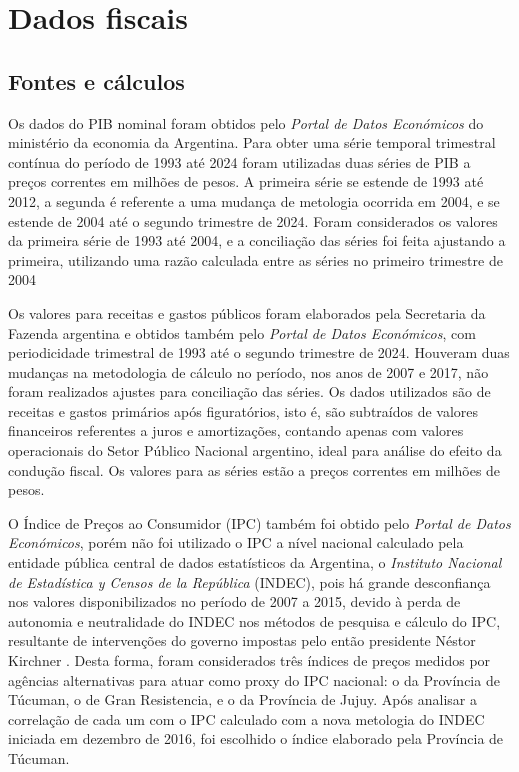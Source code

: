 \documentclass[a4paper, 12pt, openany, oneside, brazil]{abntex2}
\begin{document}
\chapter{Dados fiscais}

\section{Fontes e cálculos}

Os dados do PIB nominal foram obtidos pelo \textit{Portal de Datos Económicos} do ministério da economia da Argentina. Para obter uma série temporal trimestral contínua do período de 1993 até 2024 foram utilizadas duas séries de PIB a preços correntes em milhões de pesos. A primeira série se estende de 1993 até 2012, a segunda é referente a uma mudança de metologia ocorrida em 2004, e se estende de 2004 até o segundo trimestre de 2024. Foram considerados os valores da primeira série de 1993 até 2004, e a conciliação das séries foi feita ajustando a primeira, utilizando uma razão calculada entre as séries no primeiro trimestre de 2004

Os valores para receitas e gastos públicos foram elaborados pela Secretaria da Fazenda argentina e obtidos também pelo \textit{Portal de Datos Económicos}, com periodicidade trimestral de 1993 até o segundo trimestre de 2024. Houveram duas mudanças na metodologia de cálculo no período, nos anos de 2007 e 2017, não foram realizados ajustes para conciliação das séries. Os dados utilizados são de receitas e gastos primários após figuratórios, isto é, são subtraídos de valores financeiros referentes a juros e amortizações, contando apenas com valores operacionais do Setor Público Nacional argentino, ideal para análise do efeito da condução fiscal. Os valores para as séries estão a preços correntes em milhões de pesos.

O Índice de Preços ao Consumidor (IPC) também foi obtido pelo \textit{Portal de Datos Económicos}, porém não foi utilizado o IPC a nível nacional calculado pela entidade pública central de dados estatísticos da Argentina, o \textit{Instituto Nacional de Estadística y Censos de la República} (INDEC), pois há grande desconfiança nos valores disponibilizados no período de 2007 a 2015, devido à perda de autonomia e neutralidade do INDEC nos métodos de pesquisa e cálculo do IPC, resultante de intervenções do governo impostas pelo então presidente Néstor Kirchner \cite{Daniel2019}. Desta forma, foram considerados três índices de preços medidos por agências alternativas para atuar como proxy do IPC nacional: o da Província de Túcuman, o de Gran Resistencia, e o da Província de Jujuy. Após analisar a correlação de cada um com o IPC calculado com a nova metologia do INDEC iniciada em dezembro de 2016, foi escolhido o índice elaborado pela Província de Túcuman.
\end{document}
